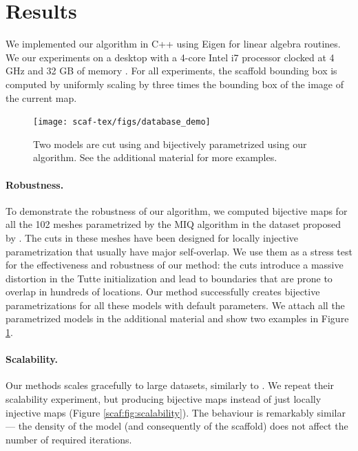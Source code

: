 \section{Results}
We implemented our algorithm in C++ using Eigen for linear algebra routines. We  our experiments on a desktop with a 4-core Intel i7  processor clocked at 4 GHz and 32 GB of memory . For all experiments, the scaffold bounding box is computed by uniformly scaling by three times the bounding box of the image of the current map. 

\begin{figure}[t]
\texttt{[image: scaf-tex/figs/database\_demo]}
\caption{Two models are cut using \cite{Bommes:2009} and bijectively parametrized using our algorithm. See the additional material for more examples.}
\label{scaf:fig:miq_database}
\vspace{-0.2cm}
\end{figure}

\paragraph{Robustness.} To demonstrate the robustness of our algorithm, we computed  bijective maps for all the 102 meshes parametrized by the MIQ algorithm \cite{Bommes:2009}  in the dataset proposed by \cite{Myles:2014}. The cuts in these meshes have been designed for locally injective parametrization that usually have major self-overlap. We use them as a stress test for the effectiveness and robustness of our method:  the cuts introduce a massive distortion in the Tutte initialization and lead to boundaries that are prone to overlap in hundreds of locations. Our method successfully creates bijective parametrizations for all these models with default parameters. We attach all the parametrized models in the additional material and show two examples in Figure \ref{scaf:fig:miq_database}. 


\paragraph{Scalability.} Our methods scales gracefully to large datasets, similarly to \cite{Rabinovich:2017}. We repeat their scalability experiment, but producing bijective maps instead of just locally injective maps (Figure \ref{scaf:fig:scalability}). The behaviour is remarkably similar --- the density of the model (and consequently of the scaffold) does not affect the number of required iterations. 


